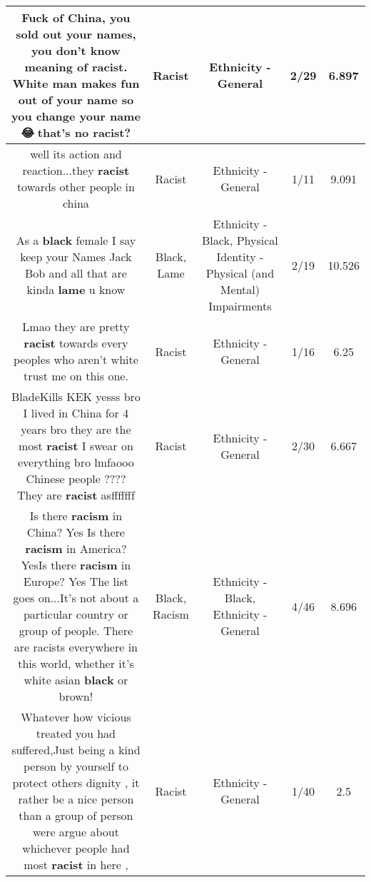 \documentclass[11pt]{article}
\newlength\mylength
\begin{document}
\begin{center}
\begin{longtable}{|C{.65\mylength}|C{.30\mylength}|C{.12\mylength}|C{.12\mylength}|C{.12\mylength}|}
  \small Fuck of China, you sold out your names, you don't know meaning of \textbf{racist}. White man makes fun out of your name so you change your name😂🤣that's no \textbf{racist}?\normalsize   & Racist & Ethnicity - General & 2/29 & 6.897 \\  \hline
  \small well its action and reaction...they \textbf{racist} towards other people in china\normalsize   & Racist & Ethnicity - General & 1/11 & 9.091 \\  \hline
  \small As a \textbf{black} female I say keep your Names Jack Bob and all that are kinda \textbf{lame} u know\normalsize   & Black, Lame & Ethnicity - Black, Physical Identity - Physical (and Mental) Impairments & 2/19 & 10.526 \\  \hline
  \small Lmao they are pretty \textbf{racist} towards every peoples who aren't white trust me on this one.\normalsize   & Racist & Ethnicity - General & 1/16 & 6.25 \\  \hline
  \small BladeKills KEK yesss bro I lived in China for 4 years bro they are the most \textbf{racist} I swear on everything bro lmfaooo Chinese people ???? They are \textbf{racist} asfffffff\normalsize   & Racist & Ethnicity - General & 2/30 & 6.667 \\  \hline
  \small Is there \textbf{racism} in China? Yes Is there \textbf{racism} in America? YesIs there \textbf{racism} in Europe? Yes The list goes on...It's not about a particular country or group of people. There are racists everywhere in this world, whether it's white asian \textbf{black} or brown!\normalsize   & Black, Racism & Ethnicity - Black, Ethnicity - General & 4/46 & 8.696 \\  \hline
  \small Whatever how vicious treated you had suffered,Just being a kind person by yourself to protect others dignity , it rather be a nice person than a group of person were argue about whichever people had most \textbf{racist} in here ,\normalsize   & Racist & Ethnicity - General & 1/40 & 2.5 \\  \hline

\end{longtable}
\end{center}
\end{document}
